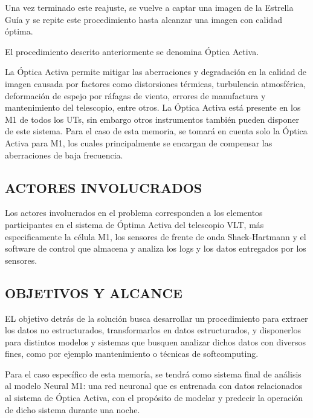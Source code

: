 Una vez terminado este reajuste, se vuelve a captar una imagen de la Estrella Guía y se repite este procedimiento hasta alcanzar una imagen con calidad óptima.

El procedimiento descrito anteriormente se denomina Óptica Activa\cite{eso1998vlt}.

La Óptica Activa permite mitigar las aberraciones y degradación en la calidad de imagen causada por factores como distorsiones térmicas, turbulencia atmosférica, deformación de espejo por ráfagas de viento, errores de manufactura y mantenimiento del telescopio, entre otros.
La Óptica Activa está presente en los M1 de todos los UTs, sin embargo otros instrumentos también pueden disponer de este sistema. Para el caso de esta memoria, se tomará en cuenta
solo la Óptica Activa para M1, los cuales principalmente se encargan de compensar las aberraciones de baja frecuencia\cite{wilson1987active}.

\subsection{ACTORES INVOLUCRADOS}

Los actores involucrados en el problema corresponden a los elementos participantes en el sistema de Óptima Activa del telescopio VLT, más especificamente la célula M1, los sensores de frente de onda Shack-Hartmann y el software de control que almacena y analiza los logs y los datos entregados por los sensores\cite{eso2011vlt}.

\subsection{OBJETIVOS Y ALCANCE}

EL objetivo detrás de la solución busca desarrollar un procedimiento para extraer los datos no estructurados, transformarlos en datos estructurados, y disponerlos para distintos modelos y sistemas
que busquen analizar dichos datos con diversos fines, como por ejemplo mantenimiento o técnicas de softcomputing.

Para el caso específico de esta memoría, se tendrá como sistema final de análisis al modelo Neural M1: una red neuronal que es entrenada con datos relacionados al sistema de Óptica Activa, con el propósito de modelar y predecir la operación de dicho sistema durante una noche.
